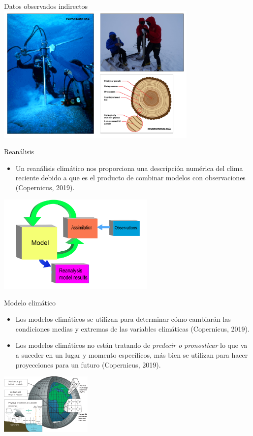 \documentclass{beamer}
\begin{document}
\begin{frame}{Datos observados indirectos}
\includegraphics[height=6.8cm]{img/dataind.png}
\centering
\end{frame}

\begin{frame}{Reanálisis}
	\begin{itemize}
	\setlength\itemsep{1em}  
	\item Un reanálisis climático nos proporciona una descripción numérica del clima reciente debido a que es el producto de combinar modelos con observaciones (Copernicus, 2019). 
	\end{itemize}
	\begin{center} 
	\includegraphics[height=4.8cm]{img/reanalisis.png}
	\end{center}

\end{frame}


\begin{frame}{Modelo climático}
	\begin{itemize}
	\setlength\itemsep{1em}  
	\item Los modelos climáticos se utilizan para determinar cómo cambiarán las condiciones medias y extremas de las variables climáticas (Copernicus, 2019). 
	\item Los modelos climáticos no están tratando de \emph{predecir o pronosticar} lo que va a suceder en un lugar y momento específicos, más bien se utilizan para hacer proyecciones para un futuro (Copernicus, 2019). 
\end{itemize}
	\begin{center} 
	\includegraphics[height=3cm]{img/climmodel.png}
	\end{center}

\end{frame}
\end{document}
